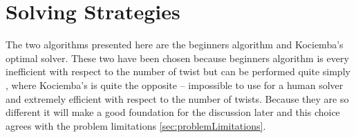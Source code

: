 \chapter{Solving Strategies}
The two algorithms presented here are the beginners algorithm and Kociemba's optimal solver.
These two have been chosen because beginners algorithm is every inefficient with respect to the number of twist but can be performed quite simply \cite{beginner}, where Kociemba's is quite the opposite -- impossible to use for a human solver and extremely efficient with respect to the number of twists.
Because they are so different it will make a good foundation for the discussion later and this choice agrees with the problem limitations \ref{sec:problemLimitations}.

	
	
